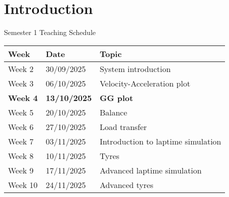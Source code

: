 \section*{Introduction}

\begin{frame}{Semester 1 Teaching Schedule}
    \begin{table}
        \renewcommand{\arraystretch}{1.5}
        \begin{tabular}{l l l}
            \textbf{Week} & \textbf{Date} & \textbf{Topic} \\
            \hline
            Week 2 & 30/09/2025 & System introduction \\
            Week 3 & 06/10/2025 & Velocity-Acceleration plot \\
            \textbf{Week 4} & \textbf{13/10/2025} & \textbf{GG plot} \\
            Week 5 & 20/10/2025 & Balance \\
            Week 6 & 27/10/2025 & Load transfer \\
            Week 7 & 03/11/2025 & Introduction to laptime simulation \\
            Week 8 & 10/11/2025 & Tyres \\
            Week 9 & 17/11/2025 & Advanced laptime simulation \\
            Week 10& 24/11/2025 & Advanced tyres
        \end{tabular}
    \end{table}
\end{frame}